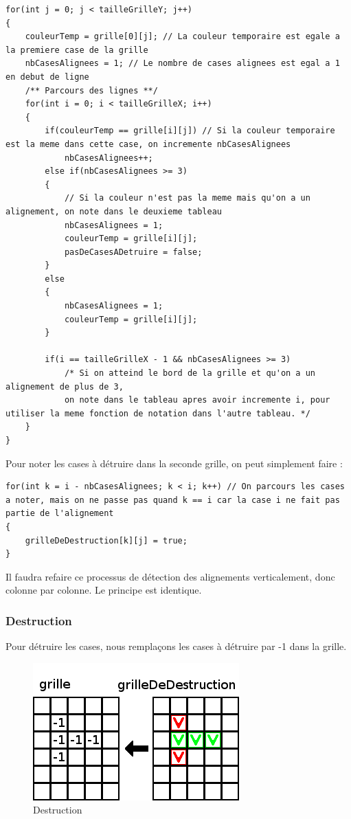 \begin{lstlisting}
for(int j = 0; j < tailleGrilleY; j++)
{
	couleurTemp = grille[0][j]; // La couleur temporaire est egale a la premiere case de la grille
	nbCasesAlignees = 1; // Le nombre de cases alignees est egal a 1 en debut de ligne
	/** Parcours des lignes **/
	for(int i = 0; i < tailleGrilleX; i++)
	{
		if(couleurTemp == grille[i][j]) // Si la couleur temporaire est la meme dans cette case, on incremente nbCasesAlignees
			nbCasesAlignees++;
		else if(nbCasesAlignees >= 3)
		{
			// Si la couleur n'est pas la meme mais qu'on a un alignement, on note dans le deuxieme tableau
			nbCasesAlignees = 1;
			couleurTemp = grille[i][j];
			pasDeCasesADetruire = false;
		}
		else
		{
			nbCasesAlignees = 1;
			couleurTemp = grille[i][j];
		}

		if(i == tailleGrilleX - 1 && nbCasesAlignees >= 3) 
			/* Si on atteind le bord de la grille et qu'on a un alignement de plus de 3,
			on note dans le tableau apres avoir incremente i, pour utiliser la meme fonction de notation dans l'autre tableau. */
	}
} 
\end{lstlisting}
		Pour noter les cases à détruire dans la seconde grille, on peut simplement faire :
\begin{lstlisting}
for(int k = i - nbCasesAlignees; k < i; k++) // On parcours les cases a noter, mais on ne passe pas quand k == i car la case i ne fait pas partie de l'alignement
{
	grilleDeDestruction[k][j] = true;
}
\end{lstlisting}

Il faudra refaire ce processus de détection des alignements verticalement, donc colonne par colonne. Le principe est identique.

\subsubsection{Destruction}

Pour détruire les cases, nous remplaçons les cases à détruire par -1 dans la grille.

\begin{figure}[position]
	\center
	\caption{\label{Destruction} Destruction}
	\includegraphics{imgs/Destruction}
\end{figure}

